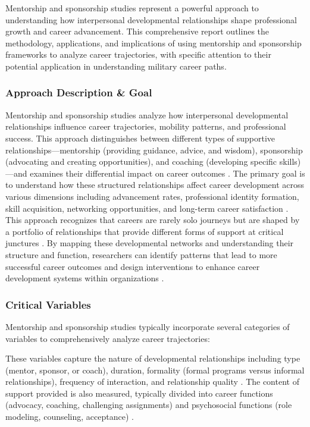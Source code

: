 \documentclass[main.tex]{subfiles}
\begin{document}
Mentorship and sponsorship studies represent a powerful approach to understanding how interpersonal developmental relationships shape professional growth and career advancement. This comprehensive report outlines the methodology, applications, and implications of using mentorship and sponsorship frameworks to analyze career trajectories, with specific attention to their potential application in understanding military career paths.

\subsubsection{Approach Description \& Goal}

Mentorship and sponsorship studies analyze how interpersonal developmental relationships influence career trajectories, mobility patterns, and professional success. This approach distinguishes between different types of supportive relationships—mentorship (providing guidance, advice, and wisdom), sponsorship (advocating and creating opportunities), and coaching (developing specific skills)—and examines their differential impact on career outcomes \parencite{alachkar2023sponsor, rsna2021mentorship}. The primary goal is to understand how these structured relationships affect career development across various dimensions including advancement rates, professional identity formation, skill acquisition, networking opportunities, and long-term career satisfaction \parencite{dubois2011does, togetherplatform2023mentoring}. This approach recognizes that careers are rarely solo journeys but are shaped by a portfolio of relationships that provide different forms of support at critical junctures \parencite{higgins2023celebrating}. By mapping these developmental networks and understanding their structure and function, researchers can identify patterns that lead to more successful career outcomes and design interventions to enhance career development systems within organizations \parencite{alachkar2023sponsor}.

\subsubsection{Critical Variables}

Mentorship and sponsorship studies typically incorporate several categories of variables to comprehensively analyze career trajectories:

These variables capture the nature of developmental relationships including type (mentor, sponsor, or coach), duration, formality (formal programs versus informal relationships), frequency of interaction, and relationship quality \parencite{alachkar2023sponsor, rsna2021mentorship}. The content of support provided is also measured, typically divided into career functions (advocacy, coaching, challenging assignments) and psychosocial functions (role modeling, counseling, acceptance) \parencite{higgins2023celebrating, togetherplatform2023mentoring}.
\end{document}

